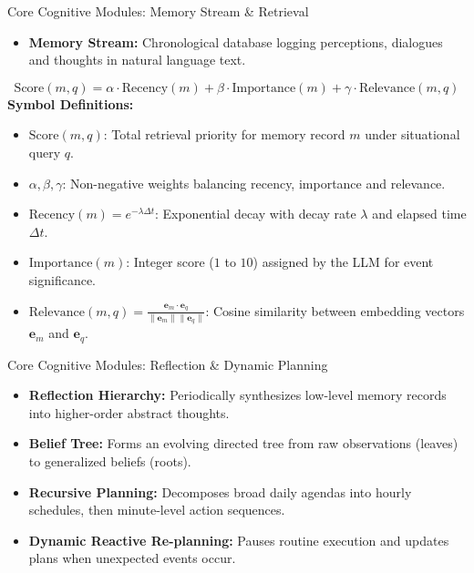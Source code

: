 \documentclass{beamer}
\begin{document}
\begin{frame}{Core Cognitive Modules: Memory Stream \& Retrieval}
\begin{itemize}
    \item \textbf{Memory Stream:} Chronological database logging perceptions, dialogues and thoughts in natural language text.
\end{itemize}
\vspace{-0.15cm}
\begin{equation*}
\text{Score}(m, q) = \alpha \cdot \text{Recency}(m) + \beta \cdot \text{Importance}(m) + \gamma \cdot \text{Relevance}(m, q)
\end{equation*}
\vspace{-0.25cm}
\textbf{Symbol Definitions:}
\vspace{0.1cm}
\begin{itemize}
    \item $\text{Score}(m, q)$: Total retrieval priority for memory record $m$ under situational query $q$.
    \item $\alpha, \beta, \gamma$: Non-negative weights balancing recency, importance and relevance.
    \item $\text{Recency}(m) = e^{-\lambda \Delta t}$: Exponential decay with decay rate $\lambda$ and elapsed time $\Delta t$.
    \item $\text{Importance}(m)$: Integer score ($1$ to $10$) assigned by the LLM for event significance.
    \item $\text{Relevance}(m, q) = \frac{\mathbf{e}_m \cdot \mathbf{e}_q}{\|\mathbf{e}_m\| \|\mathbf{e}_q\|}$: Cosine similarity between embedding vectors $\mathbf{e}_m$ and $\mathbf{e}_q$.
\end{itemize}
\end{frame}

\begin{frame}{Core Cognitive Modules: Reflection \& Dynamic Planning}
\begin{itemize}
    \item \textbf{Reflection Hierarchy:} Periodically synthesizes low-level memory records into higher-order abstract thoughts.
    \medskip
    \item \textbf{Belief Tree:} Forms an evolving directed tree from raw observations (leaves) to generalized beliefs (roots).
    \medskip
    \item \textbf{Recursive Planning:} Decomposes broad daily agendas into hourly schedules, then minute-level action sequences.
    \medskip
    \item \textbf{Dynamic Reactive Re-planning:} Pauses routine execution and updates plans when unexpected events occur.
\end{itemize}
\end{frame}
\end{document}

